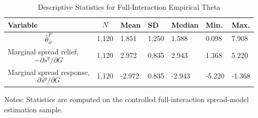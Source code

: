 \begin{table}[H]\centering
\begin{threeparttable}
\caption{Descriptive Statistics for Full-Interaction Empirical Theta}
\label{tab:theta_descriptive_stats}
\scriptsize
\begin{tabularx}{\textwidth}{lYYYYYY}
\toprule
Variable & $$N$$ & Mean & SD & Median & Min. & Max. \\
\midrule
$$\widehat{\theta}^{F}_{it}$$ & 1,120 & 1.851 & 1.250 & 1.588 & 0.098 & 7.908 \\
Marginal spread relief, $$-\partial s^g/\partial G$$ & 1,120 & 2.972 & 0.835 & 2.943 & 1.368 & 5.220 \\
Marginal spread response, $$\partial s^g/\partial G$$ & 1,120 & -2.972 & 0.835 & -2.943 & -5.220 & -1.368 \\
\bottomrule
\end{tabularx}
\begin{tablenotes}[flushleft]\footnotesize
\item Notes: Statistics are computed on the controlled full-interaction spread-model estimation sample.
\end{tablenotes}
\end{threeparttable}
\end{table}
